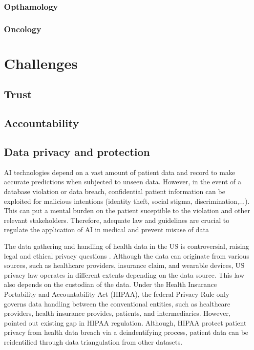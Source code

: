\documentclass{article}
\begin{document}
\subsubsection{Opthamology}
\subsubsection{Oncology}

\section{Challenges}
\subsection{Trust}
\subsection{Accountability}
\subsection{Data privacy and protection}
AI technologies depend on a vast amount of patient data and record to make accurate predictions when subjected to unseen data.
However, in the event of a database violation or data breach, confidential patient information can be exploited for malicious intentions (identity theft, social stigma, discrimination,...).
This can put a mental burden on the patient suceptible to the violation and other relevant stakeholders.
Therefore, adequate law and guidelines are crucial to regulate the application of AI in medical and prevent misuse of data


The data gathering and handling of health data in the US is controversial, raising legal and ethical privacy questions \cite{price_privacy_2019}.
Although the data can originate from various sources, such as healthcare providers, insurance claim, and wearable devices, US privacy law operates in different extents depending on the data source.
This law also depends on the custodian of the data. Under the Health Insurance Portability and Accountability Act (HIPAA), the federal Privacy Rule only governs data handling between the conventional entities, such as healthcare providers, health insurance provides, patients, and intermediaries. 
However, \cite{price_privacy_2019} pointed out existing gap in HIPAA regulation.
Although, HIPAA protect patient privacy from health data breach via a deindentifying process, patient data can be reidentified through data triangulation from other datasets.
\end{document}
